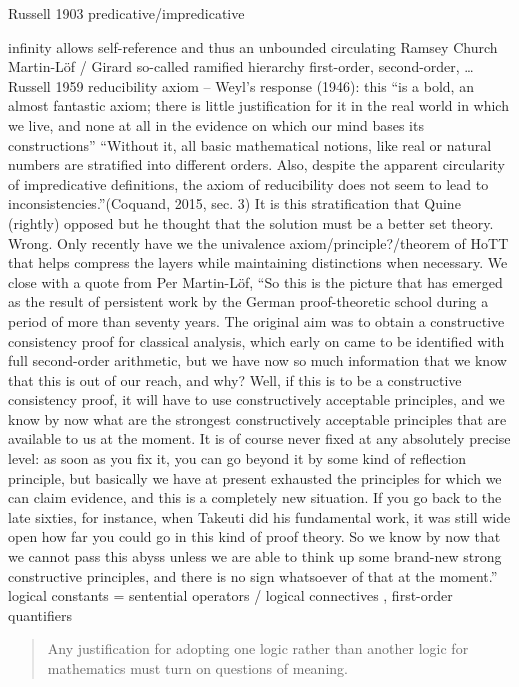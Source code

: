 \documentclass[dah,phd,a4paper]{xe_uccthesis}
\begin{document}
Russell 1903
predicative/impredicative

infinity allows self-reference and thus an unbounded circulating
Ramsey
Church
Martin-Löf / Girard
so-called ramified hierarchy
first-order, second-order, …
Russell 1959
reducibility axiom – Weyl's response (1946):  this “is a bold, an almost fantastic axiom; there is little justification for it in the real world in which we live, and none at all in the evidence on which our mind bases its constructions”
“Without it, all basic mathematical notions, like real or natural numbers are stratified into different orders. Also, despite the apparent circularity of impredicative definitions, the axiom of reducibility does not seem to lead to inconsistencies.”(Coquand, 2015, sec. 3)
It is this stratification that Quine (rightly) opposed but he thought that the solution must be a better set theory. Wrong.
Only recently have we the univalence axiom/principle?/theorem of HoTT that helps compress the layers while maintaining distinctions when necessary.
We close with a quote from Per Martin-Löf,
“So this is the picture that has emerged as the result of persistent work by the German proof-theoretic school during a period of more than seventy years. The original aim was to obtain a constructive consistency proof for classical analysis, which early on came to be identified with full second-order arithmetic, but we have now so much information that we know that this is out of our reach, and why? Well, if this is to be a constructive consistency proof, it will have to use constructively acceptable principles, and we know by now what are the strongest constructively acceptable principles that are available to us at the moment. It is of course never fixed at any absolutely precise level: as soon as you fix it, you can go beyond it by some kind of reflection principle, but basically we have at present exhausted the principles for which we can claim evidence, and this is a completely new situation. If you go back to the late sixties, for instance, when Takeuti did his fundamental work, it was still wide open how far you could go in this kind of proof theory. So we know by now that we cannot pass this abyss unless we are able to think up some brand-new strong constructive principles, and there is no sign whatsoever of that at the moment.”
logical constants = {sentential operators / logical connectives , first-order quantifiers}
\begin{quotation}
Any justification for adopting one logic rather than another logic for mathematics must turn on questions of meaning.
\begin{flushright}
\citep[p. 215]{dummett_philosophical_1973}
\end{flushright}
\end{quotation}
\end{document}
